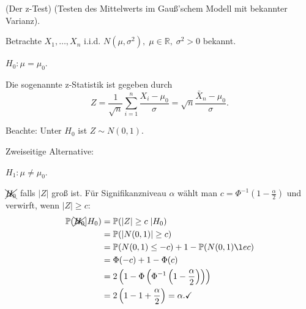 \documentclass{tstextbook}
\newcommand{\R}{\mathbb R}
\newcommand{\Prob}{\mathbb P}
\begin{document}
\begin{example}(Der z-Test)
	(Testen des Mittelwerts im Gauß'schem Modell mit bekannter Varianz). 
	
	Betrachte $ X_1,\ldots,X_n $ i.i.d. $ N(\mu,\sigma^2), \; \mu\in\R, \;\sigma^2>0 $ bekannt. 
	
	$ H_0\colon \mu=\mu_0 $. 
	
	Die sogenannte z-Statistik ist gegeben durch 
	\[
	Z = \frac{1}{\sqrt{n}}\sum_{i=1}^{n}\frac{X_i-\mu_0}{\sigma} = \sqrt{n}\frac{\bar{X}_n-\mu_0}{\sigma}.
	\]
	
	Beachte: Unter $ H_0 $ ist $ Z\sim N(0,1) $. 
	
	Zweiseitige Alternative: 
	
	$ H_1\colon \mu\ne\mu_0 $.
	
	$ \xcancel{H_0} $ falls $ |Z| $ groß ist. Für Signifikanzniveau $ \alpha $ wählt man $ c=\Phi^{-1}\left(1-\frac{\alpha}{2}\right) $ und verwirft, wenn $ |Z|\ge c $: 
	\[
	\begin{aligned}
		\Prob(\xcancel{H_0}|H_0) & = \Prob(|Z|\ge c\;|H_0) \\
		& = \Prob(|N(0,1)|\ge c) \\
		& = \Prob(N(0,1)\le -c)+1-\Prob(N(0,1)\l                          e c) \\
		& = \Phi(-c)+1-\Phi(c) \\
		& = 2\left(1-\Phi\left(\Phi^{-1}\left(1-\frac{\alpha}{2}\right)\right)\right) \\
		& = 2\left(1-1+\frac{\alpha}{2}\right) = \alpha. \checkmark
	\end{aligned}
	\]
	
		\begin{center}
	\end{center}
	

\end{example}
\end{document}
